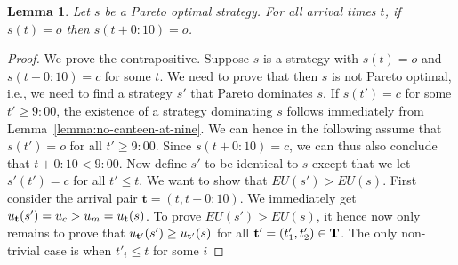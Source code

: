 \documentclass[twocolumn,a4paper,superscriptaddress,nofootinbib]{revtex4}
\newtheorem{lemma}[theorem]{Lemma}
\begin{document}
\begin{lemma}\label{lemma:no-c-after-o}
Let $s$ be a Pareto optimal strategy. For all arrival times $t$, if $s(t) = o$ then $s(t+0{:}10) = o$.
\end{lemma}
\begin{proof}
We prove the contrapositive.
Suppose $s$ is a strategy with $s(t) = o$ and $s(t+0{:}10) = c$ for some $t$. We need to prove that then $s$ is not Pareto optimal, i.e., we need to find a strategy $s'$ that  Pareto dominates $s$. %
If $s(t') = c$ for some $t' \geq 9{:}00$, the existence of a strategy dominating $s$ follows
immediately from Lemma~\ref{lemma:no-canteen-at-nine}. We can hence in the following assume that $s(t') = o$ for all $t' \geq 9{:}00$.  Since $s(t+0{:}10) = c$, we can thus also conclude that $t + 0{:}10 < 9{:}00$.
Now define $s'$ to be identical to $s$ except that we let $s'(t') = c$ for all $t' \leq t$.
We want to show that $EU(s') > EU(s)$. First consider the arrival pair $\mathbf{t} = (t,t+0{:}10)$. We immediately get $u_{\bf t}(s') = u_c > u_m = u_{\bf t}(s)$.
To prove $EU(s') > EU(s)$, it hence now only remains to prove that $u_{\bf t'}(s') \geq u_{\bf t'}(s)$ for all $\mathbf{t'} = (t'_1,t'_2) \in \bf T$. The only non-trivial case is when $t'_i \leq t$ for some $i$ 

\end{proof}
\end{document}
